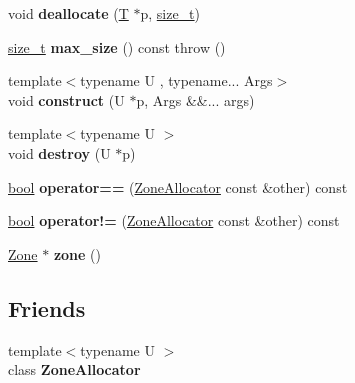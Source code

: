 \begin{DoxyCompactItemize}
void {\bfseries deallocate} (\mbox{\hyperlink{classv8_1_1internal_1_1torque_1_1T}{T}} $\ast$p, \mbox{\hyperlink{classsize__t}{size\+\_\+t}})
\item 
\mbox{\label{classv8_1_1internal_1_1ZoneAllocator_a8d270fc7b97199ce2126e3fd8a4b7629}} 
\mbox{\hyperlink{classsize__t}{size\+\_\+t}} {\bfseries max\+\_\+size} () const  throw ()
\item 
\mbox{\label{classv8_1_1internal_1_1ZoneAllocator_a93d27d7aae1b0578d424237598378bf4}} 
{\footnotesize template$<$typename U , typename... Args$>$ }\\void {\bfseries construct} (U $\ast$p, Args \&\&... args)
\item 
\mbox{\label{classv8_1_1internal_1_1ZoneAllocator_a4b2b07bd4146b7c4a6936746eb057cbe}} 
{\footnotesize template$<$typename U $>$ }\\void {\bfseries destroy} (U $\ast$p)
\item 
\mbox{\label{classv8_1_1internal_1_1ZoneAllocator_a5a1817f49d7ebd85d831a3c873c53fd5}} 
\mbox{\hyperlink{classbool}{bool}} {\bfseries operator==} (\mbox{\hyperlink{classv8_1_1internal_1_1ZoneAllocator}{Zone\+Allocator}} const \&other) const
\item 
\mbox{\label{classv8_1_1internal_1_1ZoneAllocator_a483f665c6894adbf087470270df69a23}} 
\mbox{\hyperlink{classbool}{bool}} {\bfseries operator!=} (\mbox{\hyperlink{classv8_1_1internal_1_1ZoneAllocator}{Zone\+Allocator}} const \&other) const
\item 
\mbox{\label{classv8_1_1internal_1_1ZoneAllocator_a8f37f54d271b50d1b10e3d024259c1c3}} 
\mbox{\hyperlink{classv8_1_1internal_1_1Zone}{Zone}} $\ast$ {\bfseries zone} ()
\end{DoxyCompactItemize}
\subsection*{Friends}
\begin{DoxyCompactItemize}
\item 
\mbox{\label{classv8_1_1internal_1_1ZoneAllocator_a3e627fa11818b8d284b0aeabbe30347c}} 
{\footnotesize template$<$typename U $>$ }\\class {\bfseries Zone\+Allocator}
\end{DoxyCompactItemize}


